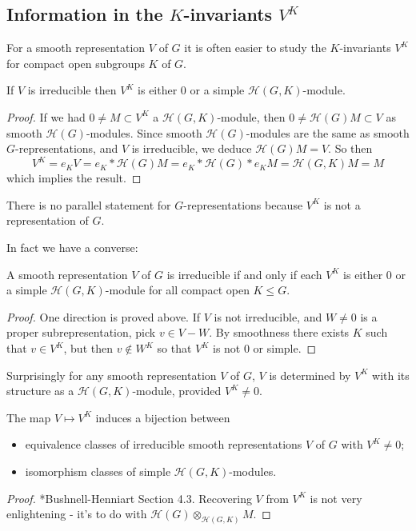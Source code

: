 \subsection{Information in the $K$-invariants $V^K$}
For a smooth representation $V$ of $G$ it is often easier to study the $K$-invariants $V^K$ for compact open subgroups $K$ of $G$.

\begin{lemma}
    If $V$ is irreducible then $V^K$ is either 0 or a simple $\mathcal H(G,K)$-module.
\end{lemma}
\begin{proof}
If we had $0 \neq M \subset V^K$ a $\mathcal H(G,K)$-module, then $0 \neq \mathcal H(G) M \subset V$ as smooth $\mathcal H(G)$-modules. Since smooth $\mathcal H(G)$-modules are the same as smooth $G$-representations, and $V$ is irreducible, we deduce $\mathcal H(G)M = V$. So then $$V^K = e_K V = e_K * \mathcal H(G)M = e_K * \mathcal H(G) *e_K M = \mathcal H(G,K)M=M$$ which implies the result.
\end{proof}
\begin{rem}
    There is no parallel statement for $G$-representations because $V^K$ is not a representation of $G$.
\end{rem}

In fact we have a converse:
\begin{lemma}
    A smooth representation $V$ of $G$ is irreducible if and only if each $V^K$ is either 0 or a simple $\mathcal H(G,K)$-module for all compact open $K \leq G$.
\end{lemma}
\begin{proof}
    One direction is proved above. If $V$ is not irreducible, and $W \neq 0$ is a proper subrepresentation, pick $v \in V-W$. By smoothness there exists $K$ such that $v \in V^K$, but then $v \not\in W^K$ so that $V^K$ is not 0 or simple.
\end{proof}

Surprisingly for any smooth representation $V$ of $G$, $V$ is determined by $V^K$ with its structure as a $\mathcal H(G,K)$-module, provided $V^K \neq 0$.

\begin{prop}
    The map $V \mapsto V^K$ induces a bijection between
    \begin{itemize}
        \item equivalence classes of irreducible smooth representations $V$ of $G$ with $V^K \neq 0$;
        \item isomorphism classes of simple $\mathcal H(G,K)$-modules.
    \end{itemize}
\end{prop}
\begin{proof}
    *Bushnell-Henniart Section 4.3. Recovering $V$ from $V^K$ is not very enlightening - it's to do with $\mathcal H(G) \otimes_{\mathcal H(G,K)} M$.
\end{proof}

